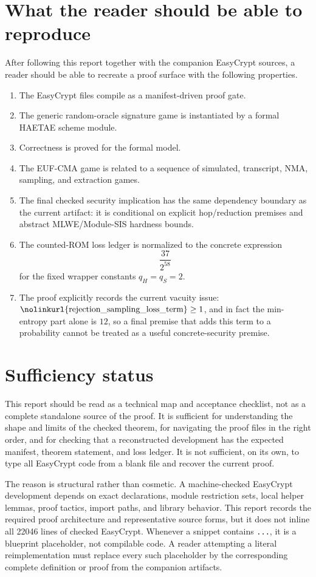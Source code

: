 \documentclass[11pt]{report}
\DeclareRobustCommand{\ec}[1]{\ifmmode\text{\nolinkurl{#1}}\else\nolinkurl{#1}\fi}
\theoremstyle{definition}
\theoremstyle{plain}
\begin{document}
\section{What the reader should be able to reproduce}

After following this report together with the companion EasyCrypt sources, a
reader should be able to recreate a proof surface with the following
properties.

\begin{enumerate}
\item The EasyCrypt files compile as a manifest-driven proof gate.
\item The generic random-oracle signature game is instantiated by a formal
HAETAE scheme module.
\item Correctness is proved for the formal model.
\item The EUF-CMA game is related to a sequence of simulated, transcript, NMA,
sampling, and extraction games.
\item The final checked security implication has the same dependency boundary
as the current artifact: it is conditional on explicit hop/reduction premises
and abstract MLWE/Module-SIS hardness bounds.
\item The counted-ROM loss ledger is normalized to the concrete expression
\[
  \frac{37}{2^{58}}
\]
for the fixed wrapper constants \(q_H=q_S=2\).
\item The proof explicitly records the current vacuity issue:
\(\ec{rejection\_sampling\_loss\_term}\ge 1\), and in fact the
min-entropy part alone is \(12\), so a final premise that adds this term to a
probability cannot be treated as a useful concrete-security premise.
\end{enumerate}

\section{Sufficiency status}

This report should be read as a technical map and acceptance checklist, not as a
complete standalone source of the proof.  It is sufficient for understanding the
shape and limits of the checked theorem, for navigating the proof files in the
right order, and for checking that a reconstructed development has the expected
manifest, theorem statement, and loss ledger.  It is not sufficient, on its own,
to type all EasyCrypt code from a blank file and recover the current proof.

The reason is structural rather than cosmetic.  A machine-checked EasyCrypt
development depends on exact declarations, module restriction sets, local helper
lemmas, proof tactics, import paths, and library behavior.  This report records
the required proof architecture and representative source forms, but it does not
inline all 22046 lines of checked EasyCrypt.  Whenever a snippet contains
\ec{...}, it is a blueprint placeholder, not compilable code.  A reader
attempting a literal reimplementation must replace every such placeholder by the
corresponding complete definition or proof from the companion artifacts.
\end{document}
